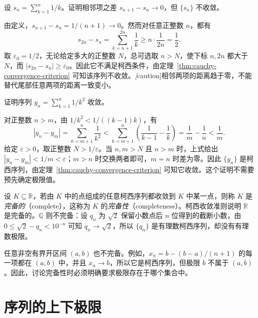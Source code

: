 \begin{example}
设 $s_n=\sum_{k=1}^{n}1/k$。证明相邻项之差 $s_{n+1}-s_n\to0$，但 $\{s_n\}$ 不收敛。
\end{example}

\begin{solve}
由定义，$s_{n+1}-s_n=1/(n+1)\to0$。然而对任意正整数 $n$，都有
\[
    s_{2n}-s_n=\sum_{k=n+1}^{2n}\frac1k
    \geq n\cdot\frac1{2n}=\frac12.
\]
取 $\varepsilon_0=1/2$，无论给定多大的正整数 $N$，总可选取 $n>N$，使下标 $n,2n$ 都大于 $N$，而 $|s_{2n}-s_n|\geq\varepsilon_0$。因此它不满足柯西条件，由定理~\ref{thm:cauchy-convergence-criterion} 可知该序列不收敛。\emph[caution]{相邻两项的距离趋于零，不能替代尾部任意两项的距离一致变小。}
\end{solve}

\begin{example}
证明序列 $y_n=\sum_{k=1}^{n}1/k^2$ 收敛。
\end{example}

\begin{solve}
对正整数 $n>m$，由 $1/k^2<1/((k-1)k)$，有
\[
    |y_n-y_m|=\sum_{k=m+1}^{n}\frac1{k^2}
    <\sum_{k=m+1}^{n}\left(\frac1{k-1}-\frac1k\right)
    =\frac1m-\frac1n<\frac1m.
\]
给定 $\varepsilon>0$，取正整数 $N>1/\varepsilon$。当 $n,m>N$ 且 $n>m$ 时，上式给出 $|y_n-y_m|<1/m<\varepsilon$；$m>n$ 时交换两者即可，$m=n$ 时差为零。因此 $\{y_n\}$ 是柯西序列，由定理~\ref{thm:cauchy-convergence-criterion} 可知它收敛。这个证明不需要预先确定极限值。
\end{solve}

\begin{remark}
\label{rem:completeness-of-real-numbers}
设 $K\subseteq\mathbb{R}$，若由 $K$ 中的点组成的任意柯西序列都收敛到 $K$ 中某一点，则称 $K$ 是\emph{完备的}（complete），这称为 $K$ 的\emph{完备性}（completeness）。柯西收敛准则说明 $\mathbb{R}$ 是完备的。$\mathbb{Q}$ 则不完备：设 $q_n$ 为 $\sqrt2$ 保留小数点后 $n$ 位得到的截断小数，由 $0\leq\sqrt2-q_n<10^{-n}$ 可知 $q_n\to\sqrt2$，所以 $\{q_n\}$ 是有理数柯西序列，却没有有理数极限。

任意非空有界开区间 $(a,b)$ 也不完备。例如，$x_n=b-(b-a)/(n+1)$ 的每一项都在 $(a,b)$ 中，并且 $x_n\to b$，所以它是柯西序列，但极限 $b$ 不属于 $(a,b)$。因此，讨论完备性时必须明确要求极限存在于哪个集合中。
\end{remark}

\section{序列的上下极限}
\label{sec:upper-and-lower-sequence-limits}

